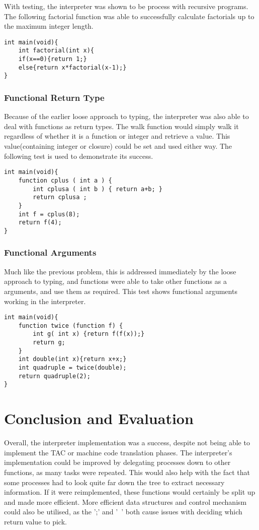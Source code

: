 \documentclass[11pt]{article}
\begin{document}
With testing, the interpreter was shown to be process with recursive programs. The following factorial function was able to successfully calculate factorials up to the maximum integer length.

\begin{lstlisting}
int main(void){
	int factorial(int x){
	if(x==0){return 1;}
	else{return x*factorial(x-1);}
}
\end{lstlisting}

\subsubsection{Functional Return Type}

Because of the earlier loose approach to typing, the interpreter was also able to deal with functions as return types. The walk function would simply walk it regardless of whether it is a function or integer and retrieve a value. This value(containing integer or closure) could be set and used either way. The following test is used to demonstrate its success.
\begin{lstlisting}
int main(void){
	function cplus ( int a ) {
		int cplusa ( int b ) { return a+b; }
		return cplusa ;
	}
	int f = cplus(8);
	return f(4);
}
\end{lstlisting}


\subsubsection{Functional Arguments}

Much like the previous problem, this is addressed immediately by the loose approach to typing, and functions were able to take other functions as a arguments, and use them as required. This test shows functional arguments working in the interpreter. 

\begin{lstlisting}
int main(void){
    function twice (function f) {
        int g( int x) {return f(f(x));}
        return g;
    }
    int double(int x){return x+x;}
    int quadruple = twice(double);
    return quadruple(2);
}
\end{lstlisting}

\section{Conclusion and Evaluation}

Overall, the interpreter implementation was a success, despite not being able to implement the TAC or machine code translation phases. The interpreter's implementation could be improved by delegating processes down to other functions, as many tasks were repeated. This would also help with the fact that some processes had to look quite far down the tree to extract necessary information. If it were reimplemented, these functions would certainly be split up and made more efficient. More efficient data structures and control mechanism could also be utilised, as the ';' and '~' both cause issues with deciding which return value to pick.  
\end{document}
